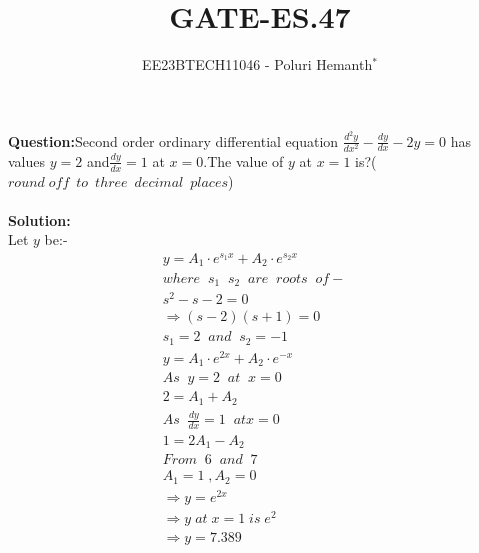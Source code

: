 \documentclass[journal,12pt,twocolumn]{IEEEtran}
\theoremstyle{remark}
\begin{document}

\vspace{3cm}

\title{GATE-ES.47}
\author{EE23BTECH11046 - Poluri Hemanth$^{*}$}
\maketitle


\textbf{Question:}Second order ordinary differential equation $\frac{d^2y}{dx^2}-\frac{dy}{dx}-2y=0$ has values 
$y=2$ and$\frac{dy}{dx}=1$ at $x=0$.The value of $y$ at $x=1$ is?($round\; off\;\: to\;\: three\;\: decimal\;\: places$) \\
\\
\textbf{Solution:}\\
Let $y$ be:-
\begin{align}
    &y=A_1\cdot e^{s_1x}+A_2\cdot e^{s_2x} &&\\ \nonumber
    &where\;\;s_1\;\;s_2\;\;are\;\;roots\;\;of-&&\\
    &s^2-s-2=0&&\\
    &\Rightarrow(s-2)(s+1)=0&&\\
    &s_1=2\;\;and\;\;s_2=-1&&\\
    &y=A_1\cdot e^{2x}+A_2\cdot e^{-x}&&\\ \nonumber
    &As\;\;y=2\;\;at\;\;x=0&&\\
    &2=A_1+A_2&&\\ \nonumber
    &As\;\;\frac{dy}{dx}=1\;\;at x=0&&\\
    &1=2A_1-A_2&&\\ \nonumber
    &From\;\;6\;\;and\;\;7&&\\
    &A_1=1\;,A_2=0&&\\
    &\Rightarrow y=e^{2x}&&\\
    &\Rightarrow y\;at\;x=1\;is\;e^2&&\\ \nonumber
    &\Rightarrow y=7.389 &&
\end{align}
\end{document}
